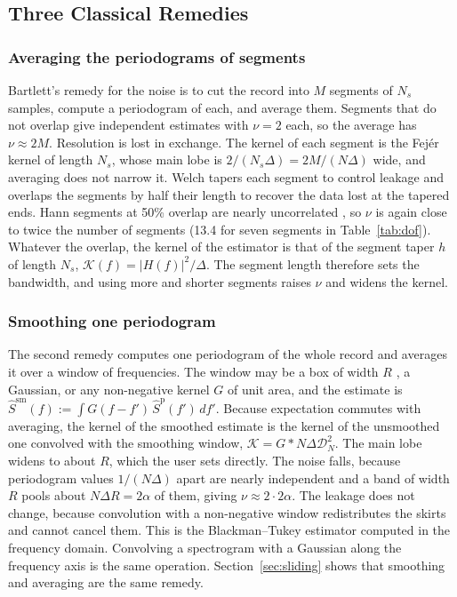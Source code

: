 \documentclass[10pt,twocolumn]{article}
\newcommand{\dd}{\,d}
\begin{document}
\subsection{Three Classical Remedies}
\label{sec:fixes}
\subsubsection{Averaging the periodograms of segments}
\label{sec:averaging}
Bartlett's remedy for the noise \cite{bartlett1948} is to cut the record into $M$ segments of $N_s$ samples, compute a periodogram of each, and average them. Segments that do not overlap give independent estimates with $\nu=2$ each, so the average has $\nu\approx2M$. Resolution is lost in exchange. The kernel of each segment is the Fej\'er kernel of length $N_s$, whose main lobe is $2/(N_s\Delta)=2M/(N\Delta)$ wide, and averaging does not narrow it. Welch \cite{welch1967} tapers each segment to control leakage and overlaps the segments by half their length to recover the data lost at the tapered ends. Hann segments at 50\% overlap are nearly uncorrelated \cite{welch1967,percival1993}, so $\nu$ is again close to twice the number of segments (13.4 for seven segments in Table~\ref{tab:dof}). Whatever the overlap, the kernel of the estimator is that of the segment taper $h$ of length $N_s$, $\mathcal{K}(f)=|H(f)|^2/\Delta$. The segment length therefore sets the bandwidth, and using more and shorter segments raises $\nu$ and widens the kernel.

\subsubsection{Smoothing one periodogram}
\label{sec:smoothing}
The second remedy computes one periodogram of the whole record and averages it over a window of frequencies. The window may be a box of width $R$ \cite{daniell1946}, a Gaussian, or any non-negative kernel $G$ of unit area, and the estimate is $\hat S^{\mathrm{sm}}(f):=\int G(f-f')\,\hat S^{\mathrm p}(f')\dd f'$. Because expectation commutes with averaging, the kernel of the smoothed estimate is the kernel of the unsmoothed one convolved with the smoothing window, $\mathcal{K}=G*N\Delta\mathcal{D}_N^2$. The main lobe widens to about $R$, which the user sets directly. The noise falls, because periodogram values $1/(N\Delta)$ apart are nearly independent and a band of width $R$ pools about $N\Delta R=2\alpha$ of them, giving $\nu\approx2\cdot2\alpha$. The leakage does not change, because convolution with a non-negative window redistributes the skirts and cannot cancel them. This is the Blackman--Tukey estimator \cite{blackman1958} computed in the frequency domain. Convolving a spectrogram with a Gaussian along the frequency axis is the same operation. Section~\ref{sec:sliding} shows that smoothing and averaging are the same remedy.
\end{document}

